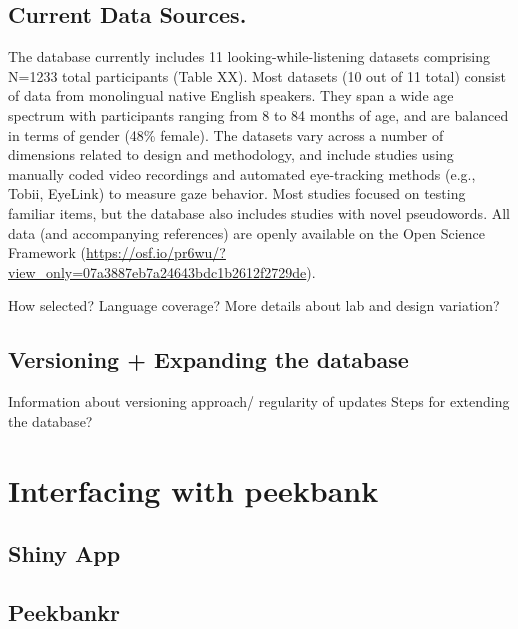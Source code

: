 \documentclass[
  english,
  man]{apa6}
\begin{document}
\hypertarget{current-data-sources.}{%
\subsection{Current Data Sources.}\label{current-data-sources.}}

The database currently includes 11 looking-while-listening datasets comprising N=1233 total participants (Table XX). Most datasets (10 out of 11 total) consist of data from monolingual native English speakers. They span a wide age spectrum with participants ranging from 8 to 84 months of age, and are balanced in terms of gender (48\% female). The datasets vary across a number of dimensions related to design and methodology, and include studies using manually coded video recordings and automated eye-tracking methods (e.g., Tobii, EyeLink) to measure gaze behavior. Most studies focused on testing familiar items, but the database also includes studies with novel pseudowords. All data (and accompanying references) are openly available on the Open Science Framework (\url{https://osf.io/pr6wu/?view_only=07a3887eb7a24643bdc1b2612f2729de}).

How selected?
Language coverage?
More details about lab and design variation?

\hypertarget{versioning-expanding-the-database}{%
\subsection{Versioning + Expanding the database}\label{versioning-expanding-the-database}}

Information about versioning approach/ regularity of updates
Steps for extending the database?

\hypertarget{interfacing-with-peekbank}{%
\section{Interfacing with peekbank}\label{interfacing-with-peekbank}}

\hypertarget{shiny-app}{%
\subsection{Shiny App}\label{shiny-app}}

\hypertarget{peekbankr}{%
\subsection{Peekbankr}\label{peekbankr}}
\end{document}
